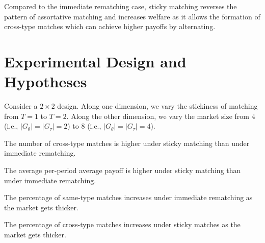 \documentclass{myPaper}
\begin{document}
Compared to the immediate rematching case, sticky matching reverses the pattern of assortative matching and increases welfare as it allows the formation of cross-type matches which can achieve higher payoffs by alternating. 

\section{Experimental Design and Hypotheses}
Consider a $2\times 2$ design. Along one dimension, we vary the stickiness of matching from $T=1$ to $T=2$. Along the other dimension, we vary the market size from $4$ (i.e., $|G_\theta|=|G_\tau|=2$) to $8$ (i.e., $|G_\theta|=|G_\tau|=4$).

\begin{hypothesis}
The number of cross-type matches is higher under sticky matching than under immediate rematching.
\end{hypothesis}

\begin{hypothesis}
The average per-period average payoff is higher under sticky matching than under immediate rematching.
\end{hypothesis}

\begin{hypothesis}
The percentage of same-type matches increases under immediate rematching as the market gets thicker. 
\end{hypothesis}

\begin{hypothesis}
The percentage of cross-type matches increases under sticky matches as the market gets thicker. 
\end{hypothesis}
\end{document}
